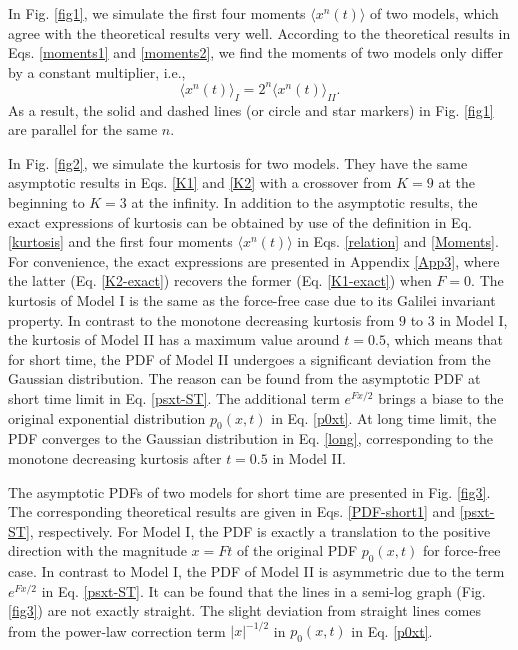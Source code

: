\documentclass[aps,pre,twocolumn,groupedaddress,longbibliography]{revtex4-2}
\begin{document}
In Fig. \ref{fig1}, we simulate the first four moments $\langle x^n(t)\rangle$ of two models, which agree with the theoretical results very well. According to the theoretical results in Eqs. \eqref{moments1} and \eqref{moments2}, we find the moments of two models only differ by a constant multiplier, i.e.,
\begin{equation}
  \langle x^n(t)\rangle_I=2^n\langle x^n(t)\rangle_{I\!I}.
\end{equation}
As a result, the solid and dashed lines (or circle and star markers) in Fig. \ref{fig1} are parallel for the same $n$.



In Fig. \ref{fig2}, we simulate the kurtosis for two models. They have the same asymptotic results in Eqs. \eqref{K1} and \eqref{K2} with a crossover from $K=9$ at the beginning to $K=3$ at the infinity. In addition to the asymptotic results, the exact expressions of kurtosis can be obtained by use of the definition in Eq. \eqref{kurtosis} and the first four moments $\langle x^n(t)\rangle$ in Eqs. \eqref{relation} and \eqref{Moments}. For convenience, the exact expressions are presented in Appendix \ref{App3}, where the latter (Eq. \eqref{K2-exact}) recovers the former (Eq. \eqref{K1-exact}) when $F=0$. The kurtosis of Model I is the same as the force-free case \cite{ChechkinSenoMetzlerSokolov:2017} due to its Galilei invariant property.
In contrast to the monotone decreasing kurtosis from $9$ to $3$ in Model I, the kurtosis of Model II has a maximum value around $t=0.5$, which means that for short time, the PDF of Model II undergoes a significant deviation from the Gaussian distribution. The reason can be found from the asymptotic PDF at short time limit in Eq. \eqref{psxt-ST}. The additional term $e^{Fx/2}$ brings a biase to the original exponential distribution $p_0(x,t)$ in Eq. \eqref{p0xt}. At long time limit, the PDF converges to the Gaussian distribution in Eq. \eqref{long}, corresponding to the monotone decreasing kurtosis after $t=0.5$ in Model II.



The asymptotic PDFs of two models for short time are presented in Fig. \ref{fig3}. The corresponding theoretical results are given in Eqs. \eqref{PDF-short1} and \eqref{psxt-ST}, respectively. For Model I, the PDF is exactly a translation to the positive direction with the magnitude $x=Ft$ of the original PDF $p_0(x,t)$ for force-free case. In contrast to Model I, the PDF of Model II is asymmetric due to the term $e^{Fx/2}$ in Eq. \eqref{psxt-ST}. It can be found that the lines in a semi-log graph (Fig. \ref{fig3}) are not exactly straight. The slight deviation from straight lines comes from the power-law correction term $|x|^{-1/2}$ in $p_0(x,t)$ in Eq. \eqref{p0xt}.
\end{document}
